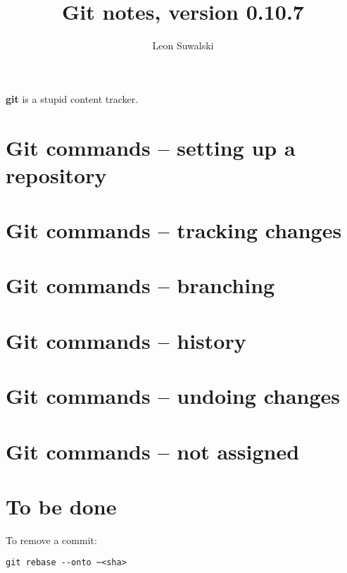 \documentclass{charuun}
\title{Git notes, version 0.10.7}
\author{Leon Suwalski}
\begin{document}
\maketitle
\raggedright

\textbf{git} is a stupid content tracker.

\section{Git commands -- setting up a repository}



\section{Git commands -- tracking changes}






\section{Git commands -- branching}





\section{Git commands -- history}






\section{Git commands -- undoing changes}




\section{Git commands -- not assigned}









\section{To be done}
To remove a commit:
\begin{verbatim}
git rebase --onto ~<sha>
\end{verbatim}
\end{document}
